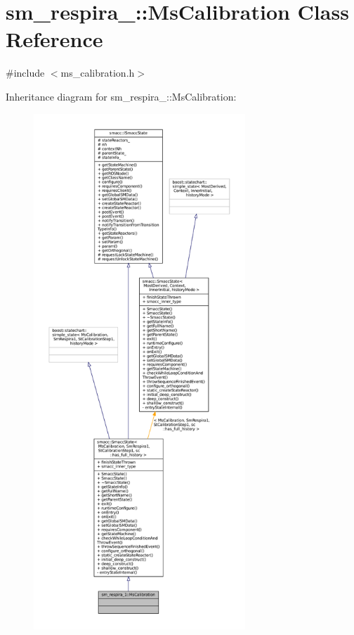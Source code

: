 \hypertarget{classsm__respira__1_1_1MsCalibration}{}\section{sm\+\_\+respira\+\_\+:\+:Ms\+Calibration Class Reference}
\label{classsm__respira__1_1_1MsCalibration}


{\ttfamily \#include $<$ms\+\_\+calibration.\+h$>$}



Inheritance diagram for sm\+\_\+respira\+\_\+:\+:Ms\+Calibration\+:
\nopagebreak
\begin{figure}[H]
\begin{center}
\leavevmode
\includegraphics[height=550pt]{classsm__respira__1_1_1MsCalibration__inherit__graph}
\end{center}
\end{figure}


